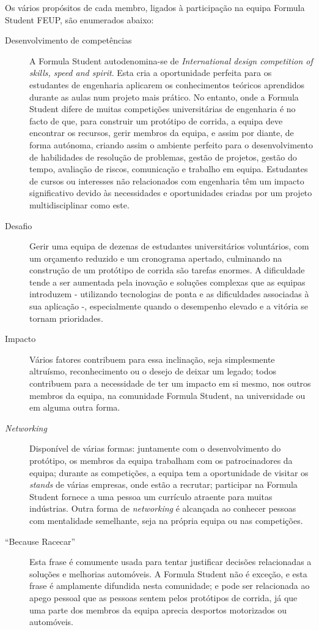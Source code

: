 Os vários propósitos de cada membro, ligados à participação na equipa Formula Student FEUP, são enumerados abaixo:

\begin{description}
  \item[Desenvolvimento de competências] A Formula Student autodenomina-se de \textit{International design competition of skills, speed and spirit}. Esta cria a oportunidade perfeita para os estudantes de engenharia aplicarem os conhecimentos teóricos aprendidos durante as aulas num projeto mais prático. No entanto, onde a Formula Student difere de muitas competições universitárias de engenharia é no facto de que, para construir um protótipo de corrida, a equipa deve encontrar os recursos, gerir membros da equipa, e assim por diante, de forma autónoma, criando assim o ambiente perfeito para o desenvolvimento de habilidades de resolução de problemas, gestão de projetos, gestão do tempo, avaliação de riscos, comunicação e trabalho em equipa. Estudantes de cursos ou interesses não relacionados com engenharia têm um impacto significativo devido às necessidades e oportunidades criadas por um projeto multidisciplinar como este.
  \item[Desafio] Gerir uma equipa de dezenas de estudantes universitários voluntários, com um orçamento reduzido e um cronograma apertado, culminando na construção de um protótipo de corrida são tarefas enormes. A dificuldade tende a ser aumentada pela inovação e soluções complexas que as equipas introduzem - utilizando tecnologias de ponta e as dificuldades associadas à sua aplicação -, especialmente quando o desempenho elevado e a vitória se tornam prioridades.
  \item[Impacto] Vários fatores contribuem para essa inclinação, seja simplesmente altruísmo, reconhecimento ou o desejo de deixar um legado; todos contribuem para a necessidade de ter um impacto em si mesmo, nos outros membros da equipa, na comunidade Formula Student, na universidade ou em alguma outra forma.
  \item[\textit{Networking}] Disponível de várias formas: juntamente com o desenvolvimento do protótipo, os membros da equipa trabalham com os patrocinadores da equipa; durante as competições, a equipa tem a oportunidade de visitar os \textit{stands} de várias empresas, onde estão a recrutar; participar na Formula Student fornece a uma pessoa um currículo atraente para muitas indústrias. Outra forma de \textit{networking} é alcançada ao conhecer pessoas com mentalidade semelhante, seja na própria equipa ou nas competições.
  \item[``Because Racecar''] Esta frase é comumente usada para tentar justificar decisões relacionadas a soluções e melhorias automóveis. A Formula Student não é exceção, e esta frase é amplamente difundida nesta comunidade; e pode ser relacionada ao apego pessoal que as pessoas sentem pelos protótipos de corrida, já que uma parte dos membros da equipa aprecia desportos motorizados ou automóveis.
\end{description}

